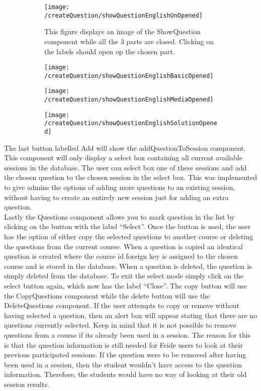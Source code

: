 \begin{figure}[H]
	\centering
	\begin{subfigure}{0.80\linewidth}
		\texttt{[image: /createQuestion/showQuestionEnglishUnOpened]}
		\caption{This figure displays an image of the ShowQuestion component while all the 3 parts are closed. Clicking on the labels should open op the chosen part.}
		\label{fig:showQuestionUnOpened}
	\end{subfigure}
	\begin{subfigure}{0.32\linewidth}
		\texttt{[image: /createQuestion/showQuestionEnglishBasicOpened]}
		\caption{}
		\label{fig:showQuestionBasicOpened}
	\end{subfigure}
	\begin{subfigure}{0.32\linewidth}
		\texttt{[image: /createQuestion/showQuestionEnglishMediaOpened]}
		\caption{}
		\label{fig:showQuestionMediaOpened}
	\end{subfigure}
	\begin{subfigure}{0.32\linewidth}
		\texttt{[image: /createQuestion/showQuestionEnglishSolutionOpened]}
		\caption{}
		\label{fig:showQuestionSolutionOpened}
	\end{subfigure}
\end{figure}
\noindent
The last button labelled Add will show the addQuestionToSession component. This component will only display a select box containing all current available sessions in the database. The user can select box one of these sessions and add the chosen question to the chosen session in the select box. This was implemented to give admins the options of adding more questions to an existing session, without having to create an entirely new session just for adding an extra question.
\\[11pt]
Lastly the Questions component allows you to mark question in the list by clicking on the button with the label “Select”. Once the button is used, the user has the option of either copy the selected questions to another course or deleting the questions from the current course. When a question is copied an identical question is created where the course id foreign key is assigned to the chosen course and is stored in the database. When a question is deleted, the question is simply deleted from the database. To exit the select mode simply click on the select button again, which now has the label “Close”. The copy button will use the CopyQuestions component while the delete button will use the DeleteQuestions component. If the user attempts to copy or remove without having selected a question, then an alert box will appear stating that there are no questions currently selected. Keep in mind that it is not possible to remove questions from a course if its already been used in a session. The reason for this is that the question information is still needed for Feide users to look at their previous participated sessions. If the question were to be removed after having been used in a session, then the student wouldn't have access to the question information. Therefore, the students would have no way of looking at their old session results. 

